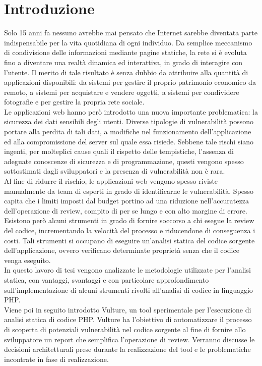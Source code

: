 \chapter{Introduzione}
Solo 15 anni fa nessuno avrebbe mai pensato che Internet sarebbe diventata parte indispensabile per la vita quotidiana di ogni individuo. Da semplice meccanismo di condivisione delle informazioni mediante pagine statiche, la rete si è evoluta fino a diventare una realtà dinamica ed interattiva, in grado di interagire con l'utente.
Il merito di tale risultato è senza dubbio da attribuire alla quantità di applicazioni disponibili: da sistemi per gestire il proprio patrimonio economico da remoto, a sistemi per acquistare e vendere oggetti, a sistemi per condividere fotografie e per gestire la propria rete sociale.\\
Le applicazioni web hanno però introdotto una nuova importante problematica: la sicurezza dei dati sensibili degli utenti. Diverse tipologie di vulnerabilità possono portare alla perdita di tali dati, a modifiche nel funzionamento dell'applicazione ed alla compromissione del server sul quale essa risiede. Sebbene tale rischi siano ingenti, per molteplici cause quali il rispetto delle tempistiche, l'assenza di adeguate conoscenze di sicurezza e di programmazione, questi vengono spesso sottostimati dagli sviluppatori e la presenza di vulnerabilità non è rara. \\
Al fine di ridurre il rischio, le applicazioni web vengono spesso riviste manualmente da team di esperti in grado di identificarne le vulnerabilità. Spesso capita che i limiti imposti dal budget portino ad una riduzione nell'accuratezza dell'operazione di review, compito di per se lungo e con alto margine di errore.\\
Esistono però alcuni strumenti in grado di fornire soccorso a chi esegue la review del codice, incrementando la velocità del processo e riducendone di conseguenza i costi. Tali strumenti si occupano di eseguire un'analisi statica del codice sorgente dell'applicazione, ovvero verificano determinate proprietà senza che il codice venga eseguito.\\
In questo lavoro di tesi vengono analizzate le metodologie utilizzate per l'analisi statica, con vantaggi, svantaggi e con particolare approfondimento sull'implementazione di alcuni strumenti rivolti all'analisi di codice in linguaggio PHP.\\
Viene poi in seguito introdotto Vulture, un tool sperimentale per l'esecuzione di analisi statica di codice PHP. Vulture ha l'obiettivo di automatizzare il processo di scoperta di potenziali vulnerabilità nel codice sorgente al fine di fornire allo sviluppatore un report che semplifica l'operazione di review. Verranno discusse le decisioni architetturali prese durante la realizzazione del tool e le problematiche incontrate in fase di realizzazione. 